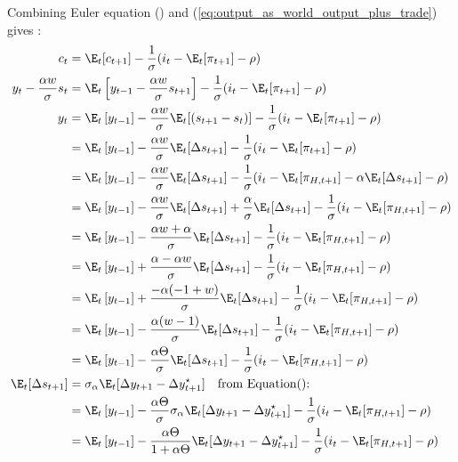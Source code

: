 \begin{landscape}
Combining Euler equation () and (\ref{eq:output_as_world_output_plus_trade}) gives :
\begin{align*}
    c_t &=  \E_t[c_{t+1}] - \frac{1}{\sigma}( i_t  - \E_t [\pi_{t+1}] - \rho  ) \\
    y_t - \frac{\alpha w}{\sigma}s_t &= \E_t\left[y_{t-1} - \frac{\alpha w}{\sigma}s_{t+1} \right]- \frac{1}{\sigma}( i_t  - \E_t [\pi_{t+1}] - \rho  ) \\
    y_t &= \E_t\left[y_{t-1}\right] - \frac{\alpha w}{\sigma}\E_t[(s_{t+1}-s_t)]- \frac{1}{\sigma}( i_t  - \E_t [\pi_{t+1}] - \rho  ) \\
    &= \E_t\left[y_{t-1}\right] - \frac{\alpha w}{\sigma}\E_t[\Delta s_{t+1}]- \frac{1}{\sigma}( i_t  - \E_t [\pi_{t+1}] - \rho  ) \\
    &= \E_t\left[y_{t-1}\right] - \frac{\alpha w}{\sigma}\E_t[\Delta s_{t+1}]- \frac{1}{\sigma}( i_t  - \E_t [\pi_{H,t+1}] - \alpha \E_t[\Delta s_{t+1}] - \rho  ) \\
    &= \E_t\left[y_{t-1}\right] - \frac{\alpha w}{\sigma}\E_t[\Delta s_{t+1}] + \frac{\alpha}{\sigma} \E_t[\Delta s_{t+1}] - \frac{1}{\sigma}( i_t  - \E_t [\pi_{H,t+1}] - \rho  ) \\
    &= \E_t\left[y_{t-1}\right] - \frac{\alpha w+\alpha}{\sigma}\E_t[\Delta s_{t+1}] - \frac{1}{\sigma}( i_t  - \E_t [\pi_{H,t+1}] - \rho  ) \\
    &= \E_t\left[y_{t-1}\right] + \frac{\alpha - \alpha w}{\sigma}\E_t[\Delta s_{t+1}] - \frac{1}{\sigma}( i_t  - \E_t [\pi_{H,t+1}] - \rho  ) \\
    &= \E_t\left[y_{t-1}\right] + \frac{-\alpha (-1+w)}{\sigma}\E_t[\Delta s_{t+1}] - \frac{1}{\sigma}( i_t  - \E_t [\pi_{H,t+1}] - \rho  ) \\
    &= \E_t\left[y_{t-1}\right] - \frac{\alpha(w-1)}{\sigma}\E_t[\Delta s_{t+1}] - \frac{1}{\sigma}( i_t  - \E_t [\pi_{H,t+1}] - \rho  ) \\
    &= \E_t\left[y_{t-1}\right] - \frac{\alpha \Theta}{\sigma}\E_t[\Delta s_{t+1}] - \frac{1}{\sigma}( i_t  - \E_t [\pi_{H,t+1}] - \rho  ) \\
    \E_t[\Delta s_{t+1}] &= \sigma_\alpha \E_t[\Delta y_{t+1} - \Delta y_{t+1}^{\star}] \quad \text{from Equation(): } \\
    &= \E_t\left[y_{t-1}\right] - \frac{\alpha \Theta}{\sigma}\sigma_\alpha \E_t[\Delta y_{t+1} - \Delta y_{t+1}^{\star}] - \frac{1}{\sigma}( i_t  - \E_t [\pi_{H,t+1}] - \rho  ) \\
    &= \E_t\left[y_{t-1}\right] - \frac{\alpha \Theta}{1+\alpha \Theta} \E_t[\Delta y_{t+1} - \Delta y_{t+1}^{\star}] - \frac{1}{\sigma}( i_t  - \E_t [\pi_{H,t+1}] - \rho  ) \\

\end{align*}
\end{landscape}
